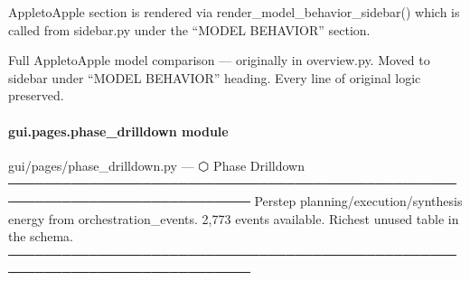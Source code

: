 \documentclass[letterpaper,10pt,english]{sphinxmanual}
\begin{document}
\begin{description}
\sphinxAtStartPar
Apple\sphinxhyphen{}to\sphinxhyphen{}Apple section is rendered via render\_model\_behavior\_sidebar()
which is called from sidebar.py under the “MODEL BEHAVIOR” section.

\end{description}

\begin{fulllineitems}
\label{\detokenize{gui.pages.overview:gui.pages.overview.render}}
\pysigstartsignatures
\pysiglinewithargsret
{}
{}
{}
\pysigstopsignatures
\end{fulllineitems}


\begin{fulllineitems}
\label{\detokenize{gui.pages.overview:gui.pages.overview.render_model_behavior_sidebar}}
\pysigstartsignatures
\pysiglinewithargsret
{}
{}
{}
\pysigstopsignatures
\sphinxAtStartPar
Full Apple\sphinxhyphen{}to\sphinxhyphen{}Apple model comparison — originally in overview.py.
Moved to sidebar under “MODEL BEHAVIOR” heading.
Every line of original logic preserved.

\end{fulllineitems}


\sphinxstepscope


\paragraph{gui.pages.phase\_drilldown module}
\label{\detokenize{gui.pages.phase_drilldown:module-gui.pages.phase_drilldown}}\label{\detokenize{gui.pages.phase_drilldown:gui-pages-phase-drilldown-module}}\label{\detokenize{gui.pages.phase_drilldown::doc}}
\sphinxAtStartPar
gui/pages/phase\_drilldown.py  —  ⬡  Phase Drilldown
─────────────────────────────────────────────────────────────────────────────
Per\sphinxhyphen{}step planning/execution/synthesis energy from orchestration\_events.
2,773 events available. Richest unused table in the schema.
─────────────────────────────────────────────────────────────────────────────
\end{document}
